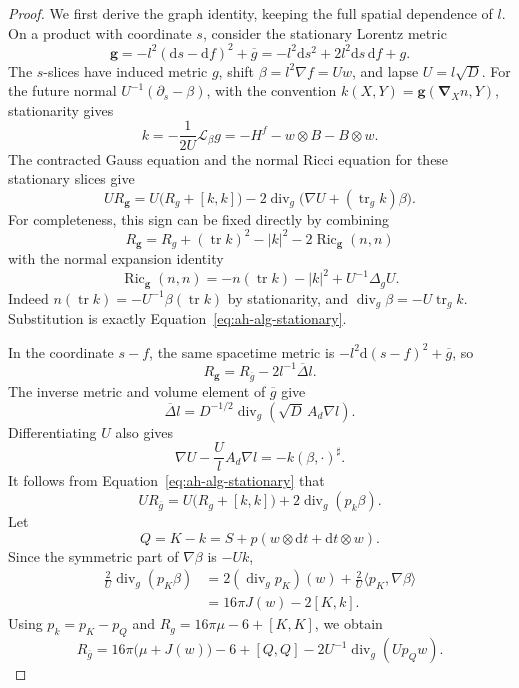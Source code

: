 \begin{proof}
We first derive the graph identity, keeping the full spatial
dependence of \(l\).  On a product with coordinate \(s\), consider the
stationary Lorentz metric
\[
 \mathbf g=-l^2(\mathrm ds-\mathrm df)^2+\overline g
           =-l^2\mathrm ds^2+2l^2\mathrm ds\,\mathrm df+g .
\]
The \(s\)-slices have induced metric \(g\), shift
\(\beta=l^2\nabla f=Uw\), and lapse \(U=l\sqrt D\).  For the future
normal \(U^{-1}(\partial_s-\beta)\), with the convention
\(k(X,Y)=\mathbf g(\mathbf\nabla_X n,Y)\), stationarity gives
\[
 k=-\frac{1}{2U}\mathcal L_\beta g
   =-H^f-w\otimes B-B\otimes w .
\]
The contracted Gauss equation and the normal Ricci equation for these
stationary slices give
\begin{equation}
 U R_{\mathbf g}
 =U\bigl(R_g+[k,k]\bigr)
   -2\operatorname{div}_g\bigl(\nabla U+(\operatorname{tr}_g k)\beta\bigr).
 \label{eq:ah-alg-stationary}
\end{equation}
For completeness, this sign can be fixed directly by combining
\[
 R_{\mathbf g}=R_g+(\operatorname{tr}k)^2-|k|^2
                   -2\operatorname{Ric}_{\mathbf g}(n,n)
\]
with the normal expansion identity
\[
 \operatorname{Ric}_{\mathbf g}(n,n)
 =-n(\operatorname{tr}k)-|k|^2
       +U^{-1}\Delta_g U .
\]
Indeed \(n(\operatorname{tr}k)=-U^{-1}\beta(\operatorname{tr}k)\)
by stationarity, and
\(\operatorname{div}_g\beta=-U\operatorname{tr}_g k\).
Substitution is exactly
Equation~\eqref{eq:ah-alg-stationary}.

In the coordinate \(s-f\), the same spacetime metric is
\(-l^2\mathrm d(s-f)^2+\overline g\), so
\[
 R_{\mathbf g}=R_{\overline g}-2l^{-1}\overline\Delta l .
\]
The inverse metric and volume element of \(\overline g\) give
\[
 \overline\Delta l
   =D^{-1/2}\operatorname{div}_g(\sqrt D\,A_d\nabla l).
\]
Differentiating \(U\) also gives
\[
 \nabla U-\frac Ul A_d\nabla l=-k(\beta,\cdot)^\sharp.
\]
It follows from Equation~\eqref{eq:ah-alg-stationary} that
\[
 U R_{\overline g}
  =U\bigl(R_g+[k,k]\bigr)+2\operatorname{div}_g(p_k\beta).
\]
Let
\[
 Q=K-k=S+p(w\otimes\mathrm dt+\mathrm dt\otimes w).
\]
Since the symmetric part of \(\nabla\beta\) is \(-Uk\),
\begin{align*}
 \frac2U\operatorname{div}_g(p_K\beta)
  &=2(\operatorname{div}_g p_K)(w)
       +\frac2U\langle p_K,\nabla\beta\rangle\\
  &=16\pi J(w)-2[K,k].
\end{align*}
Using \(p_k=p_K-p_Q\) and
\(R_g=16\pi\mu-6+[K,K]\), we obtain
\begin{equation}
 R_{\overline g}
  =16\pi\bigl(\mu+J(w)\bigr)-6+[Q,Q]
       -2U^{-1}\operatorname{div}_g(Up_Qw).
 \label{eq:ah-alg-graph-curvature}
\end{equation}


\end{proof}
